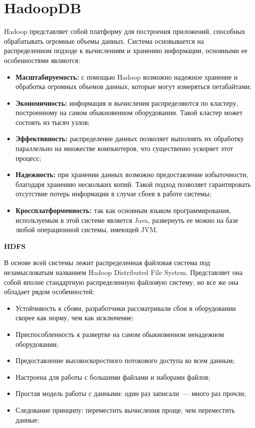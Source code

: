 \section{HadoopDB}
Hadoop  представляет собой платформу для построения приложений, способных обрабатывать огромные объемы данных.
Система основывается на распределенном подходе к вычислениям и хранению информации, основными ее особенностями являются:
\begin{itemize}
\item \textbf{Масштабируемость:} с помощью Hadoop возможно надежное хранение и обработка огромных объемов данных,
которые могут измеряться петабайтами;
\item \textbf{Экономичность:} информация и вычисления распределяются по кластеру, построенному на самом
обыкновенном оборудовании. Такой кластер может состоять из тысяч узлов;
\item \textbf{Эффективность:} распределение данных позволяет выполнять их обработку параллельно на множестве компьютеров,
что существенно ускоряет этот процесс;
\item \textbf{Надежность:} при хранении данных возможно предоставление избыточности, благодаря хранению нескольких копий.
Такой подход позволяет гарантировать отсутствие потерь информации в случае сбоев в работе системы;
\item \textbf{Кроссплатформенность:} так как основным языком программирования, используемым в этой системе является Java,
развернуть ее можно на базе любой операционной системы, имеющей JVM.
\end{itemize}

\textbf{HDFS}

В основе всей системы лежит распределенная файловая система под незамысловатым названием Hadoop
Distributed File System. Представляет она собой вполне стандартную распределенную файловую систему, но все же
она обладает рядом особенностей:
\begin{itemize}
\item Устойчивость к сбоям, разработчики рассматривали сбои в оборудовании скорее как норму, чем как исключение;
\item Приспособленность к развертке на самом обыкновенном ненадежном оборудовании;
\item Предоставление высокоскоростного потокового доступа ко всем данным;
\item Настроена для работы с большими файлами и наборами файлов;
\item Простая модель работы с данными: один раз записали~--- много раз прочли;
\item Следование принципу: переместить вычисления проще, чем переместить данные;
\end{itemize}

